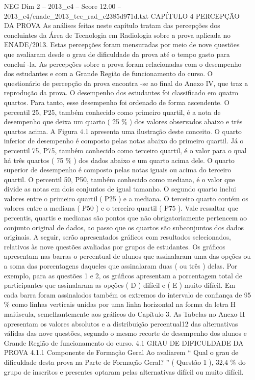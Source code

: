 \begin{textsample}{NEG Dim 2 – 2013\_c4 – Score 12.00 – 2013\_c4/enade\_2013\_tec\_rad\_c2385d971d.txt}  \label{ex:f2_neg_374}
CAPÍTULO 4 PERCEPÇÃO DA PROVA As análises feitas neste capítulo tratam das percepções dos concluintes da Área de Tecnologia em Radiologia sobre a prova aplicada no ENADE/2013.
Estas percepções foram mensuradas por meio de nove questões que avaliaram desde o grau de dificuldade da prova até o tempo gasto para concluí -la.
As percepções sobre a prova foram relacionadas com o desempenho dos estudantes e com a Grande Região de funcionamento do curso.
O questionário de percepção da prova encontra -se ao final do Anexo IV, que traz a reprodução da prova.
O desempenho dos estudantes foi classificado em quatro quartos.
Para tanto, esse desempenho foi ordenado de forma ascendente.
O percentil 25, P25, também conhecido como primeiro quartil, é a nota de desempenho que deixa um quarto ( 25 \% ) dos valores observados abaixo e três quartos acima.
A Figura 4.1 apresenta uma ilustração deste conceito.
O quarto inferior de desempenho é composto pelas notas abaixo do primeiro quartil.
Já o percentil 75, P75, também conhecido como terceiro quartil, é o valor para o qual há três quartos ( 75 \% ) dos dados abaixo e um quarto acima dele.
O quarto superior de desempenho é composto pelas notas iguais ou acima do terceiro quartil.
O percentil 50, P50, também conhecido como mediana, é o valor que divide as notas em dois conjuntos de igual tamanho.
O segundo quarto inclui valores entre o primeiro quartil ( P25 ) e a mediana.
O terceiro quarto contém os valores entre a mediana ( P50 ) e o terceiro quartil ( P75 ).
Vale ressaltar que percentis, quartis e medianas são pontos que não obrigatoriamente pertencem ao conjunto original de dados, ao passo que os quartos são subconjuntos dos dados originais.
A seguir, serão apresentados gráficos com resultados selecionados, relativos às nove questões avaliadas por grupos de estudantes.
Os gráficos apresentam nas barras o percentual de alunos que assinalaram uma das opções ou a soma das porcentagens daqueles que assinalaram duas ( ou três ) delas.
Por exemplo, para as questões 1 e 2, os gráficos apresentam a porcentagem total de participantes que assinalaram as opções ( D ) difícil e ( E ) muito difícil.
Em cada barra foram assinalados também os extremos do intervalo de confiança de 95 \% como linhas verticais unidas por uma linha horizontal na forma da letra H maiúscula, semelhantemente aos gráficos do Capítulo 3.
As Tabelas no Anexo II apresentam os valores absolutos e a distribuição percentual12 das alternativas válidas das nove questões, segundo o mesmo recorte de desempenho dos alunos e Grande Região de funcionamento do curso. 4.1 GRAU DE DIFICULDADE DA PROVA 4.1.1 Componente de Formação Geral Ao avaliarem “ Qual o grau de dificuldade desta prova na Parte de Formação Geral? ” ( Questão 1 ), 32,4 \% do grupo de inscritos e presentes optaram pelas alternativas difícil ou muito difícil.

\end{textsample}
